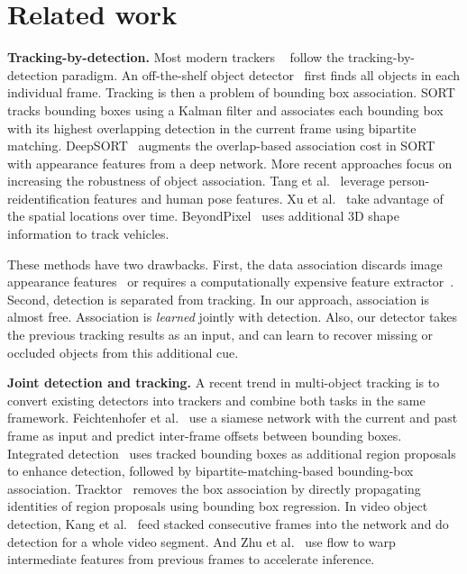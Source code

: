 \documentclass[runningheads]{llncs}
\renewcommand{\paragraph}[1]{\noindent\textbf{#1}}
\begin{document}
\section{Related work}

\paragraph{Tracking-by-detection.}
Most modern trackers ~\cite{Bewley2016_sort,Wojke2017simple,tang2017multiple,xu2019spatial,sharma2018beyond,zhu2018online,leal2016learning,fang2018recurrent,schulter2017deep} follow the tracking-by-detection paradigm.
An off-the-shelf object detector~\cite{ren2015faster,felzenszwalb2009object,yang2016exploit,ren2017accurate} first finds all objects in each individual frame.
Tracking is then a problem of bounding box association.
SORT~\cite{Bewley2016_sort} tracks bounding boxes using a Kalman filter and associates each bounding box with its highest overlapping detection in the current frame using bipartite matching.
DeepSORT~\cite{Wojke2017simple} augments the overlap-based association cost in SORT with appearance features from a deep network.
More recent approaches focus on increasing the robustness of object association.
Tang et al.~\cite{tang2017multiple} leverage person-reidentification features and human pose features.
Xu et al.~\cite{xu2019spatial} take advantage of the spatial locations over time.
BeyondPixel~\cite{sharma2018beyond} uses additional 3D shape information to track vehicles.

These methods have two drawbacks. First, the data association discards image appearance features~\cite{Bewley2016_sort} or requires a computationally expensive feature extractor~\cite{tang2017multiple, sharma2018beyond,xu2019spatial,feng2019multi}. Second, detection is separated from tracking.
In our approach, association is almost free.
Association is \emph{learned} jointly with detection.
Also, our detector takes the previous tracking results as an input, and can learn to recover missing or occluded objects from this additional cue.

\paragraph{Joint detection and tracking.}
A recent trend in multi-object tracking is to convert existing detectors into trackers and combine both tasks in the same framework.
Feichtenhofer et al.~\cite{feichtenhofer2017detect} use a siamese network with the current and past frame as input and predict inter-frame offsets between bounding boxes.
Integrated detection~\cite{zhang2018integrated} uses tracked bounding boxes as additional region proposals to enhance detection, followed by bipartite-matching-based bounding-box association.
Tracktor~\cite{bergmann2019tracking} removes the box association
by directly propagating identities of region proposals using bounding box regression.
In video object detection, Kang et al.~\cite{kang2017object,kang2017t} feed stacked consecutive frames into the network and do detection for a whole video segment. 
And Zhu et al.~\cite{zhu2017flow} use flow to warp intermediate features from previous frames to accelerate inference.
\end{document}
